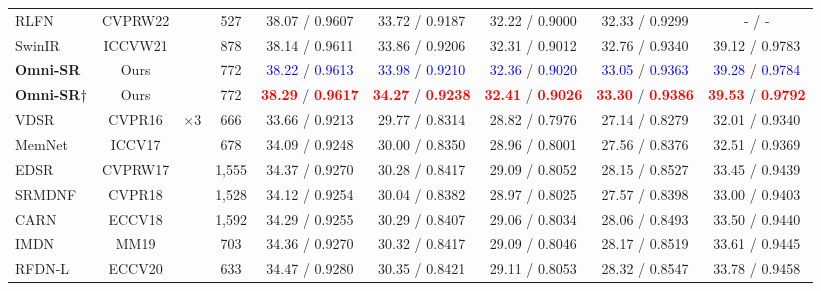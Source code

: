 \begin{table*}[t]
\begin{tabular}{l|c|c|c|c|c|c|c|c}
	RLFN~\cite{RLFN} & CVPRW22&   & 527 & 38.07 / 0.9607 & 33.72 / 0.9187 & 32.22 / 0.9000 & 32.33 / 0.9299 & - / -  \\
	
	SwinIR~\cite{swinir} &  ICCVW21& & 878 & 		 38.14 / 0.9611 & 33.86 / 0.9206 & 32.31 / 0.9012 & 32.76 / 0.9340 & 39.12 / 0.9783 \\
    

	\rowcolor{green!08}
	\textbf{Omni-SR} & Ours &  & 772 &  \textcolor{blue}{38.22} / \textcolor{blue}{0.9613} & \textcolor{blue}{33.98} / \textcolor{blue}{0.9210} & 
 \textcolor{blue}{32.36} / \textcolor{blue}{0.9020} & \textcolor{blue}{33.05} / \textcolor{blue}{0.9363}  & \textcolor{blue}{39.28} / \textcolor{blue}{0.9784} \\
	\rowcolor{green!08}
	\textbf{Omni-SR${\small \dagger}$ } & Ours & & 772  &  \textcolor{red}{\textbf{38.29}} / \textcolor{red}{\textbf{0.9617}} & \textcolor{red}{\textbf{34.27}} / \textcolor{red}{\textbf{0.9238}} & \textcolor{red}{\textbf{32.41}} / \textcolor{red}{\textbf{0.9026}} & \textcolor{red}{\textbf{33.30}} / \textcolor{red}{\textbf{0.9386}}  & \textcolor{red}{\textbf{39.53}} / \textcolor{red}{\textbf{0.9792}} \\
		
	\midrule
	VDSR~\cite{vdsr}  & CVPR16& \multirow{13}{*}{$\times 3$} &   666 & 33.66 / 0.9213 & 29.77 / 0.8314 & 28.82 / 0.7976 & 27.14 / 0.8279 & 32.01 / 0.9340 \\
	
	MemNet~\cite{memnet} & ICCV17 &   & 678 & 34.09 / 0.9248 & 30.00 / 0.8350 & 28.96 / 0.8001 & 27.56 / 0.8376 & 32.51 / 0.9369\\
	
	EDSR~\cite{edsr} &CVPRW17&    & 1,555 & 34.37 / 0.9270 & 30.28 / 0.8417 & 29.09 / 0.8052 & 28.15 / 0.8527 & 33.45 / 0.9439 \\
	
	SRMDNF~\cite{srmdnf} & CVPR18 &   & 1,528 & 34.12 / 0.9254 & 30.04 / 0.8382 & 28.97 / 0.8025 & 27.57 / 0.8398 & 33.00 / 0.9403 \\
	
	CARN~\cite{CARN} & ECCV18&    & 1,592 & 34.29 / 0.9255 & 30.29 / 0.8407 & 29.06 / 0.8034 & 28.06 / 0.8493 & 33.50 / 0.9440 \\
		
    IMDN~\cite{imdn} & MM19 &   & 703 & 34.36 / 0.9270 & 30.32 / 0.8417 & 29.09 / 0.8046 & 28.17 / 0.8519 & 33.61 / 0.9445 \\

    RFDN-L~\cite{liu2020residual} & ECCV20&   & 633 & 34.47 / 0.9280 &  30.35 / 0.8421 & 29.11 / 0.8053 & 28.32 / 0.8547  & 33.78 / 0.9458 \\


\end{tabular}
\end{table*}
